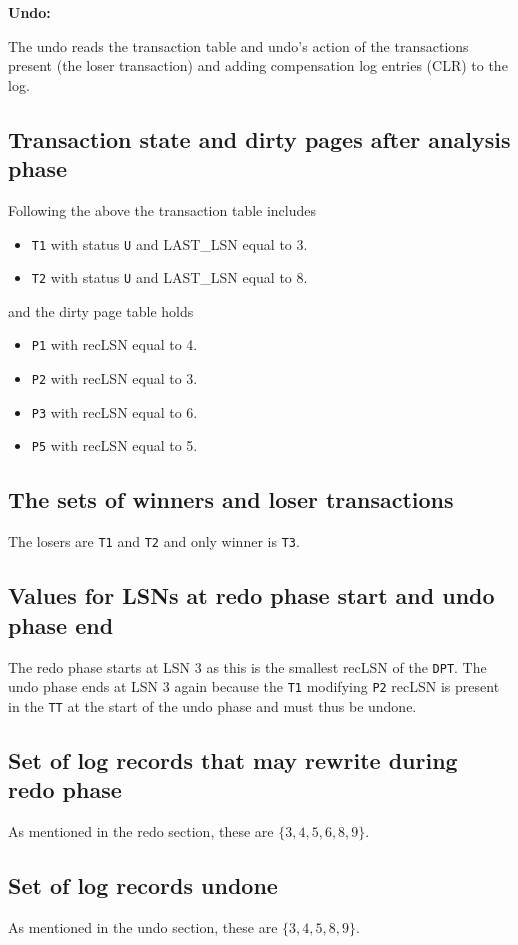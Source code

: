 \noindent
{\bf Undo:}

The undo reads the transaction table and undo's action of the transactions present (the loser transaction) and adding compensation log entries (CLR) to the log.

\subsection{Transaction state and dirty pages after analysis phase}
Following the above the transaction table includes
\begin{itemize}
\item {\tt T1} with status {\tt U} and LAST\_LSN equal to 3.
\item {\tt T2} with status {\tt U} and LAST\_LSN equal to 8.
\end{itemize}
and the dirty page table holds
\begin{itemize}
\item {\tt P1} with recLSN equal to 4.
\item {\tt P2} with recLSN equal to 3.
\item {\tt P3} with recLSN equal to 6.
\item {\tt P5} with recLSN equal to 5.
\end{itemize}

\subsection{The sets of winners and loser transactions}
The losers are {\tt T1} and {\tt T2} and only winner is {\tt T3}.

\subsection{Values for LSNs at redo phase start and undo phase end}
The redo phase starts at LSN 3 as this is the smallest recLSN of the {\tt DPT}. The undo phase ends at LSN 3 again because the {\tt T1} modifying {\tt P2} recLSN is present in the {\tt TT} at the start of the undo phase and must thus be undone.

\subsection{Set of log records that may rewrite during redo phase}
As mentioned in the redo section, these are $\{3,4,5,6,8,9\}$.

\subsection{Set of log records undone}
As mentioned in the undo section, these are $\{3,4,5,8,9\}$.

